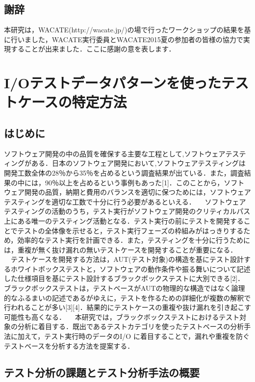 \documentclass[a4paper,12pt]{jreport}
\begin{document}
\section{謝辞}
本研究は，WACATE(http://wacate.jp/)の場で行ったワークショップの結果を基に行いました，WACATE実行委員とWACATE2015夏の参加者の皆様の協力で実現することが出来ました．ここに感謝の意を表します．


\chapter{I/Oテストデータパターンを使ったテストケースの特定方法}
\section{はじめに}
ソフトウェア開発の中の品質を確保する主要な工程として,ソフトウェアテスティングがある．日本のソフトウェア開発において,ソフトウェアテスティングは開発工数全体の28％から35％を占めるという調査結果が出ている．また，調査結果の中には，90％以上を占めるという事例もあった[1]．このことから，ソフトウェア開発の品質，納期と費用のバランスを適切に保つためには，ソフトウェアテスティングを適切な工数で十分に行う必要があるといえる．
　ソフトウェアテスティングの活動のうち，テスト実行がソフトウェア開発のクリティカルパス上にある唯一のテスティング活動となる．テスト実行の前にテストを開発することでテストの全体像を示せると，テスト実行フェーズの枠組みがはっきりするため，効率的なテスト実行を計画できる．また，テスティングを十分に行うためには，重複が無く抜け漏れの無いテストケースを開発することが重要になる．
　テストケースを開発する方法は，AUT(テスト対象)の構造を基にテスト設計するホワイトボックステストと，ソフトウェアの動作条件や振る舞いについて記述した仕様項目を基にテスト設計するブラックボックステストに大別できる[2]．ブラックボックステストは，テストベースがAUTの物理的な構造ではなく論理的なふるまいの記述であるがゆえに，テストを作るための詳細化が複数の解釈で行われることが多い[3][4]．結果的にテストケースの重複や抜け漏れを引き起こす可能性も高くなる．
　本研究では，ブラックボックステストにおけるテスト対象の分析に着目する．既出であるテストカテゴリを使ったテストベースの分析手法に加えて，テスト実行時のデータのI/O に着目することで，漏れや重複を防ぐテストベースを分析する方法を提案する．

\section{テスト分析の課題とテスト分析手法の概要}
\end{document}

